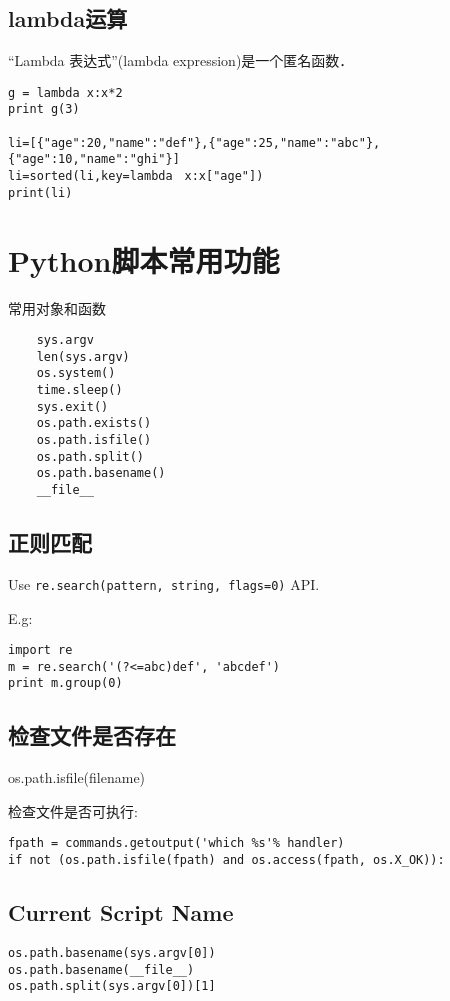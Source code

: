 \subsection{lambda运算}
“Lambda 表达式”(lambda expression)是一个匿名函数．

\begin{lstlisting}
g = lambda x:x*2
print g(3)
 
li=[{"age":20,"name":"def"},{"age":25,"name":"abc"},{"age":10,"name":"ghi"}]
li=sorted(li,key=lambda　x:x["age"])
print(li)
\end{lstlisting}





\section{Python脚本常用功能}
常用对象和函数
\begin{lstlisting}
    sys.argv
    len(sys.argv)
    os.system()
    time.sleep()
    sys.exit()
    os.path.exists()
    os.path.isfile()
    os.path.split()
    os.path.basename()
    __file__
\end{lstlisting}


\subsection{正则匹配}
Use \verb|re.search(pattern, string, flags=0)| API.

E.g:
\begin{lstlisting}
import re
m = re.search('(?<=abc)def', 'abcdef')
print m.group(0)
\end{lstlisting}

\subsection{检查文件是否存在}
os.path.isfile(filename)

检查文件是否可执行:
\begin{verbatim}
fpath = commands.getoutput('which %s'% handler)
if not (os.path.isfile(fpath) and os.access(fpath, os.X_OK)):
\end{verbatim}

\subsection{Current Script Name}
\begin{lstlisting}
os.path.basename(sys.argv[0])
os.path.basename(__file__)
os.path.split(sys.argv[0])[1]
\end{lstlisting}

